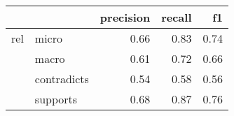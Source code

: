 \begin{tabular}{llrrr}
\toprule
    &          &  precision &  recall &   f1 \\
\midrule
rel & micro &       0.66 &    0.83 & 0.74 \\
    & macro &       0.61 &    0.72 & 0.66 \\
    & contradicts &       0.54 &    0.58 & 0.56 \\
    & supports &       0.68 &    0.87 & 0.76 \\
\bottomrule
\end{tabular}
